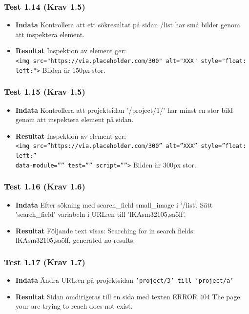\documentclass{TDP003mall}
\begin{document}
\subsubsection*{Test 1.14 (Krav 1.5)}
\begin{itemize}
\item[]\textbf{Indata} Kontrollera att ett sökresultat på sidan /list har små bilder genom att inspektera element. 
\item[]\textbf{Resultat} Inspektion av element ger:\\ \texttt{<img src="https://via.placeholder.com/300" alt="XXX" style="float: left;">} Bilden är 150px stor.
\end{itemize}
\subsubsection*{Test 1.15 (Krav 1.5)}
\begin{itemize}
\item[]\textbf{Indata} Kontrollera att projektsidan '/project/1/' har minst en stor bild genom att inspektera element på sidan.
\item[]\textbf{Resultat} Inspektion av element ger:\\ \texttt{<img src=''https://via.placeholder.com/300'' alt=''XXX'' style=''float: left;''\\ data-module='''' test='''' script=''''>} Bilden är 300px stor.
\end{itemize}
\subsubsection*{Test 1.16 (Krav 1.6)}
\begin{itemize}
\item[]\textbf{Indata} Efter sökning med search\_field small\_image i '/list'. Sätt 'search\_field' variabeln i URL:en till 'lKAsm32105,saölf'.
\item[]\textbf{Resultat} Följande text visas: Searching for in search fields: lKAsm32105,saölf, generated no results.
\end{itemize}
\subsubsection*{Test 1.17 (Krav 1.7)}
\begin{itemize}
\item[]\textbf{Indata} Ändra URL:en på projektsidan \texttt{'project/3' till 'project/a'}
\item[]\textbf{Resultat} Sidan omdirigeras till en sida med texten ERROR 404 The page your are trying to reach does not exist.
\end{itemize}
\end{document}
